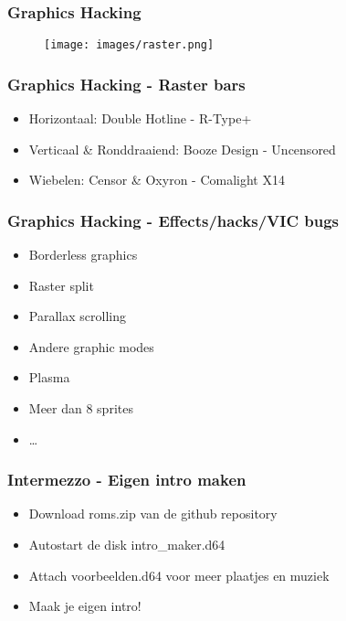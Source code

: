 
\begin{frame}
\frametitle{Graphics Hacking}

\begin{figure}
\texttt{[image: images/raster.png]}
\end{figure}

\end{frame}


\begin{frame}
\frametitle{Graphics Hacking - Raster bars}

\begin{itemize}
\item Horizontaal: Double Hotline - R-Type+
\item Verticaal \& Ronddraaiend: Booze Design - Uncensored
\item Wiebelen: Censor \& Oxyron - Comalight X14
\end{itemize}

\end{frame}


\begin{frame}
\frametitle{Graphics Hacking - Effects/hacks/VIC bugs}

\begin{itemize}
\item Borderless graphics
\item Raster split
\item Parallax scrolling
\item Andere graphic modes
\item Plasma
\item Meer dan 8 sprites
\item \dots
\end{itemize}

\end{frame}


\begin{frame}
\frametitle{Intermezzo - Eigen intro maken}

\begin{itemize}
\item Download roms.zip van de github repository
\item Autostart de disk intro\_maker.d64
\item Attach voorbeelden.d64 voor meer plaatjes en muziek
\item Maak je eigen intro!
\end{itemize}

\end{frame}
